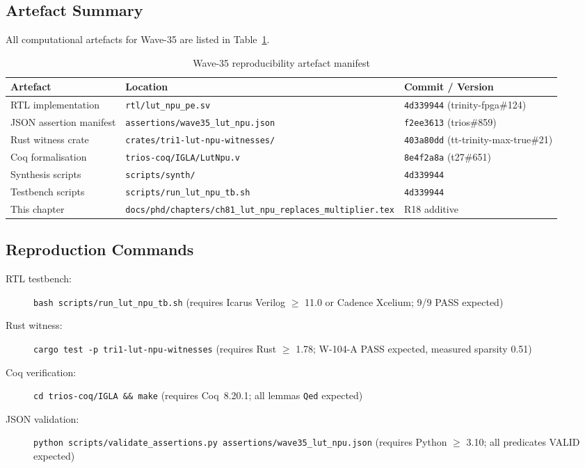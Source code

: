 \subsection{Artefact Summary}

All computational artefacts for Wave-35 are listed in
Table~\ref{tab:reproducibility}.

\begin{table}[ht]
\centering
\caption{Wave-35 reproducibility artefact manifest}
\label{tab:reproducibility}
\begin{tabular}{lll}
\hline
Artefact & Location & Commit / Version \\
\hline
RTL implementation & \texttt{rtl/lut\_npu\_pe.sv} & \texttt{4d339944} (trinity-fpga\#124) \\
JSON assertion manifest & \texttt{assertions/wave35\_lut\_npu.json} & \texttt{f2ee3613} (trios\#859) \\
Rust witness crate & \texttt{crates/tri1-lut-npu-witnesses/} & \texttt{403a80dd} (tt-trinity-max-true\#21) \\
Coq formalisation & \texttt{trios-coq/IGLA/LutNpu.v} & \texttt{8e4f2a8a} (t27\#651) \\
Synthesis scripts & \texttt{scripts/synth/} & \texttt{4d339944} \\
Testbench scripts & \texttt{scripts/run\_lut\_npu\_tb.sh} & \texttt{4d339944} \\
This chapter & \texttt{docs/phd/chapters/ch81\_lut\_npu\_replaces\_multiplier.tex} & R18 additive \\
\hline
\end{tabular}
\end{table}

\subsection{Reproduction Commands}

\begin{description}
  \item[RTL testbench:] \texttt{bash scripts/run\_lut\_npu\_tb.sh}
    (requires Icarus Verilog $\geq$ 11.0 or Cadence Xcelium; 9/9 PASS expected)
  \item[Rust witness:] \texttt{cargo test -p tri1-lut-npu-witnesses}
    (requires Rust $\geq$ 1.78; W-104-A PASS expected, measured sparsity 0.51)
  \item[Coq verification:] \texttt{cd trios-coq/IGLA \&\& make}
    (requires Coq~8.20.1; all lemmas \texttt{Qed} expected)
  \item[JSON validation:] \texttt{python scripts/validate\_assertions.py assertions/wave35\_lut\_npu.json}
    (requires Python $\geq$ 3.10; all predicates VALID expected)
\end{description}

